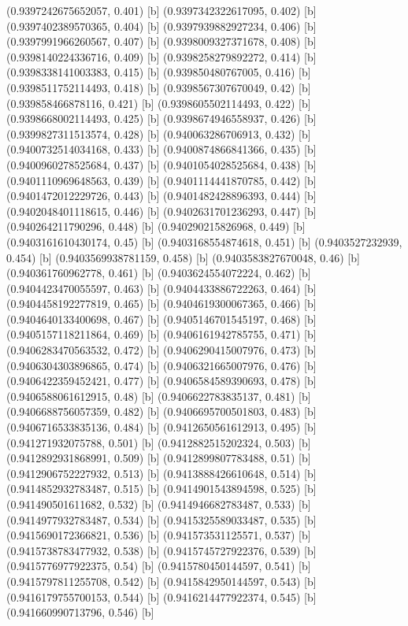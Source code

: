 {{{(0.9397242675652057, 0.401) [b] 
(0.9397342322617095, 0.402) [b] 
(0.9397402389570365, 0.404) [b] 
(0.9397939882927234, 0.406) [b] 
(0.9397991966260567, 0.407) [b] 
(0.9398009327371678, 0.408) [b] 
(0.9398140224336716, 0.409) [b] 
(0.9398258279892272, 0.414) [b] 
(0.9398338141003383, 0.415) [b] 
(0.939850480767005, 0.416) [b] 
(0.9398511752114493, 0.418) [b] 
(0.9398567307670049, 0.42) [b] 
(0.939858466878116, 0.421) [b] 
(0.9398605502114493, 0.422) [b] 
(0.9398668002114493, 0.425) [b] 
(0.9398674946558937, 0.426) [b] 
(0.9399827311513574, 0.428) [b] 
(0.940063286706913, 0.432) [b] 
(0.9400732514034168, 0.433) [b] 
(0.9400874866841366, 0.435) [b] 
(0.9400960278525684, 0.437) [b] 
(0.9401054028525684, 0.438) [b] 
(0.9401110969648563, 0.439) [b] 
(0.9401114441870785, 0.442) [b] 
(0.9401472012229726, 0.443) [b] 
(0.9401482428896393, 0.444) [b] 
(0.9402048401118615, 0.446) [b] 
(0.9402631701236293, 0.447) [b] 
(0.940264211790296, 0.448) [b] 
(0.940290215826968, 0.449) [b] 
(0.9403161610430174, 0.45) [b] 
(0.9403168554874618, 0.451) [b] 
(0.9403527232939, 0.454) [b] 
(0.9403569938781159, 0.458) [b] 
(0.9403583827670048, 0.46) [b] 
(0.940361760962778, 0.461) [b] 
(0.9403624554072224, 0.462) [b] 
(0.9404423470055597, 0.463) [b] 
(0.9404433886722263, 0.464) [b] 
(0.9404458192277819, 0.465) [b] 
(0.9404619300067365, 0.466) [b] 
(0.9404640133400698, 0.467) [b] 
(0.9405146701545197, 0.468) [b] 
(0.9405157118211864, 0.469) [b] 
(0.9406161942785755, 0.471) [b] 
(0.9406283470563532, 0.472) [b] 
(0.9406290415007976, 0.473) [b] 
(0.9406304303896865, 0.474) [b] 
(0.9406321665007976, 0.476) [b] 
(0.9406422359452421, 0.477) [b] 
(0.9406584589390693, 0.478) [b] 
(0.9406588061612915, 0.48) [b] 
(0.9406622783835137, 0.481) [b] 
(0.9406688756057359, 0.482) [b] 
(0.9406695700501803, 0.483) [b] 
(0.9406716533835136, 0.484) [b] 
(0.9412650561612913, 0.495) [b] 
(0.941271932075788, 0.501) [b] 
(0.9412882515202324, 0.503) [b] 
(0.9412892931868991, 0.509) [b] 
(0.9412899807783488, 0.51) [b] 
(0.9412906752227932, 0.513) [b] 
(0.9413888426610648, 0.514) [b] 
(0.9414852932783487, 0.515) [b] 
(0.9414901543894598, 0.525) [b] 
(0.941490501611682, 0.532) [b] 
(0.9414946682783487, 0.533) [b] 
(0.9414977932783487, 0.534) [b] 
(0.9415325589033487, 0.535) [b] 
(0.9415690172366821, 0.536) [b] 
(0.941573531125571, 0.537) [b] 
(0.9415738783477932, 0.538) [b] 
(0.9415745727922376, 0.539) [b] 
(0.9415776977922375, 0.54) [b] 
(0.9415780450144597, 0.541) [b] 
(0.9415797811255708, 0.542) [b] 
(0.9415842950144597, 0.543) [b] 
(0.9416179755700153, 0.544) [b] 
(0.9416214477922374, 0.545) [b] 
(0.941660990713796, 0.546) [b] 
}}}
